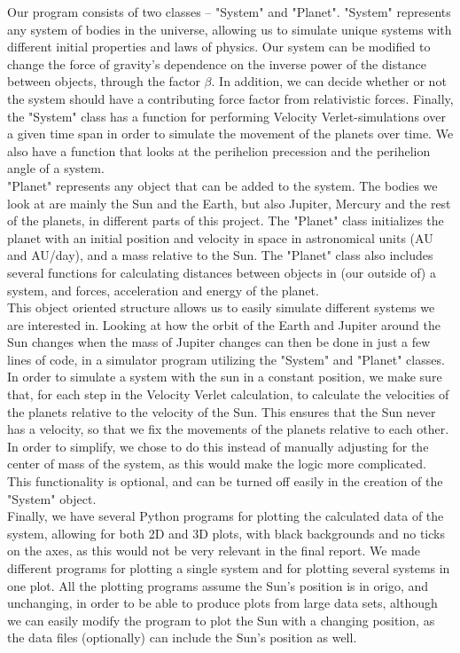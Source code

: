 \documentclass{article}
\begin{document}
    Our program consists of two classes – "System" and "Planet". "System" represents any system of bodies in the universe, allowing us to simulate unique systems with different initial properties and laws of physics. Our system can be modified to change the force of gravity's dependence on the inverse power of the distance between objects, through the factor $\beta$. In addition, we can decide whether or not the system should have a contributing force factor from relativistic forces. Finally, the "System" class has a function for performing Velocity Verlet-simulations over a given time span in order to simulate the movement of the planets over time. We also have a function that looks at the perihelion precession and the perihelion angle of a system.\\
    "Planet" represents any object that can be added to the system. The bodies we look at are mainly the Sun and the Earth, but also Jupiter, Mercury and the rest of the planets, in different parts of this project. The "Planet" class initializes the planet with an initial position and velocity in space in astronomical units (AU and AU/day), and a mass relative to the Sun. The "Planet" class also includes several functions for calculating distances between objects in (our outside of) a system, and forces, acceleration and energy of the planet.\\

    This object oriented structure allows us to easily simulate different systems we are interested in. Looking at how the orbit of the Earth and Jupiter around the Sun changes when the mass of Jupiter changes can then be done in just a few lines of code, in a simulator program utilizing the "System" and "Planet" classes.\\

    In order to simulate a system with the sun in a constant position, we make sure that, for each step in the Velocity Verlet calculation, to calculate the velocities of the planets relative to the velocity of the Sun. This ensures that the Sun never has a velocity, so that we fix the movements of the planets relative to each other. In order to simplify, we chose to do this instead of manually adjusting for the center of mass of the system, as this would make the logic more complicated. This functionality is optional, and can be turned off easily in the creation of the "System" object.\\

    Finally, we have several Python programs for plotting the calculated data of the system, allowing for both 2D and 3D plots, with black backgrounds and no ticks on the axes, as this would not be very relevant in the final report. We made different programs for plotting a single system and for plotting several systems in one plot. All the plotting programs assume the Sun's position is in origo, and unchanging, in order to be able to produce plots from large data sets, although we can easily modify the program to plot the Sun with a changing position, as the data files (optionally) can include the Sun's position as well.  
\end{document}

